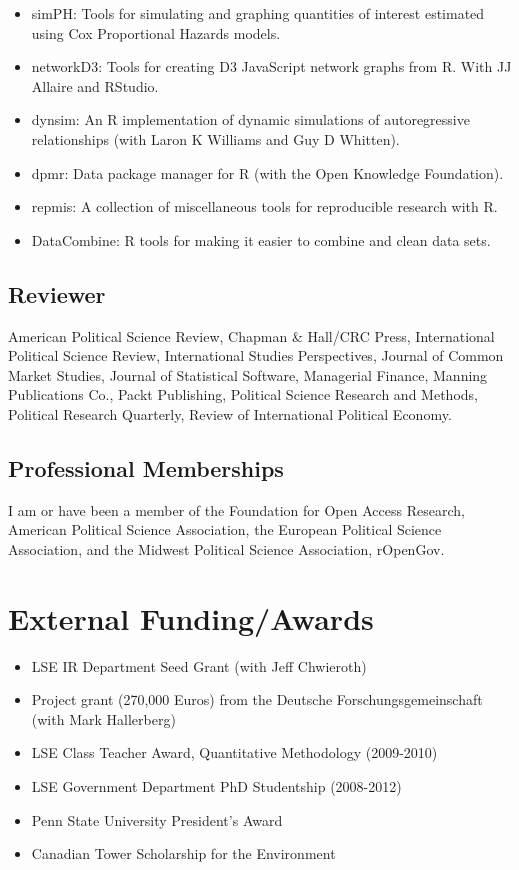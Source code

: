\documentclass[a4paper]{article}
\begin{document}
{\begin{itemize}
    \item simPH: Tools for simulating and graphing quantities of interest estimated using Cox Proportional Hazards models.
    \item networkD3: Tools for creating D3 JavaScript network graphs from R. With JJ Allaire and RStudio.
    \item dynsim: An R implementation of dynamic simulations of autoregressive relationships (with Laron K Williams and Guy D Whitten).
    \item dpmr: Data package manager for R (with the Open Knowledge Foundation).
    \item repmis: A collection of miscellaneous tools for reproducible research with R.
    \item DataCombine: R tools for making it easier to combine and clean data sets.
\end{itemize}

\subsection*{Reviewer}

American Political Science Review, Chapman \& Hall/CRC Press,
International Political Science Review, International Studies Perspectives,
Journal of Common Market Studies, Journal of Statistical Software,
Managerial Finance, Manning Publications Co.,
Packt Publishing, Political Science Research and Methods, Political Research
Quarterly, Review of International Political Economy.

\subsection*{Professional Memberships}

I am or have been a member of the Foundation for Open Access Research, American Political Science Association, the European Political Science Association, and the Midwest Political Science Association, rOpenGov.

\section*{External Funding/Awards}

\begin{itemize}

    \item LSE IR Department Seed Grant (with Jeff Chwieroth)
    \item Project grant (270,000 Euros) from the Deutsche Forschungsgemeinschaft (with Mark Hallerberg)
    \item LSE Class Teacher Award, Quantitative Methodology (2009-2010)
    \item LSE Government Department PhD Studentship (2008-2012)
    \item Penn State University President's Award
    \item Canadian Tower Scholarship for the Environment


\end{itemize}}
\end{document}
